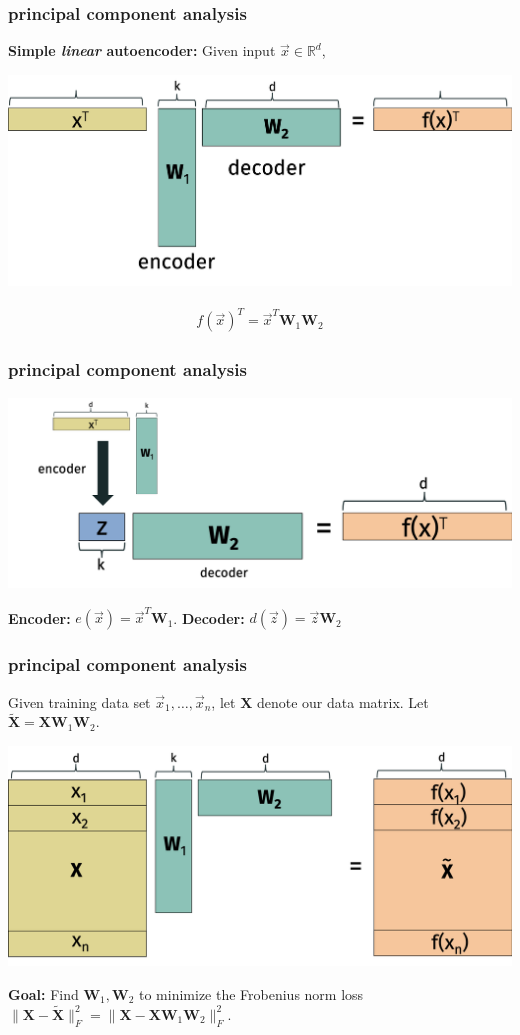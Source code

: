 \documentclass[handout,compress]{beamer}
\newcommand{\bv}[1]{\mathbf{#1}}
\newcommand{\R}{\mathbb{R}}
\begin{document}
\begin{frame}
	\frametitle{principal component analysis}
	\textbf{Simple \emph{linear} autoencoder:} Given input $\vec{x}\in \R^d$, 
		\begin{center}
		\includegraphics[width=.8\textwidth]{auto_alg.png}
	\end{center}
\begin{align*}
	f(\vec{x})^T = \vec{x}^T\bv{W}_1\bv{W}_2
\end{align*}
\end{frame}
\begin{frame}
	\frametitle{principal component analysis}
	\begin{center}
		\includegraphics[width=.8\textwidth]{enc_dec.png}
	\end{center}
	\begin{center}
		\textbf{Encoder:} $e(\vec{x}) = \vec{x}^T \bv{W}_1$. \hspace{2em} \textbf{Decoder:} $d(\vec{z}) = \vec{z}\bv{W}_2$
	\end{center}
\end{frame}

\begin{frame}
	\frametitle{principal component analysis}
	Given training data set $\vec{x}_1, \ldots, \vec{x}_n$, let $\bv{X}$ denote our data matrix. Let  $\tilde{\bv{X}} = \bv{X}\bv{W}_1\bv{W}_2$.
	\begin{center}
		\includegraphics[width=.8\textwidth]{auto_alg_agg.png}
	\end{center}
	\textbf{Goal:} Find $\bv{W}_1, \bv{W}_2$ to minimize the Frobenius norm loss $\|\bv{X} - \tilde{\bv{X}}\|_F^2 = \|\bv{X} - \bv{X}\bv{W}_1\bv{W}_2\|_F^2$. 
\end{frame}
\end{document}

